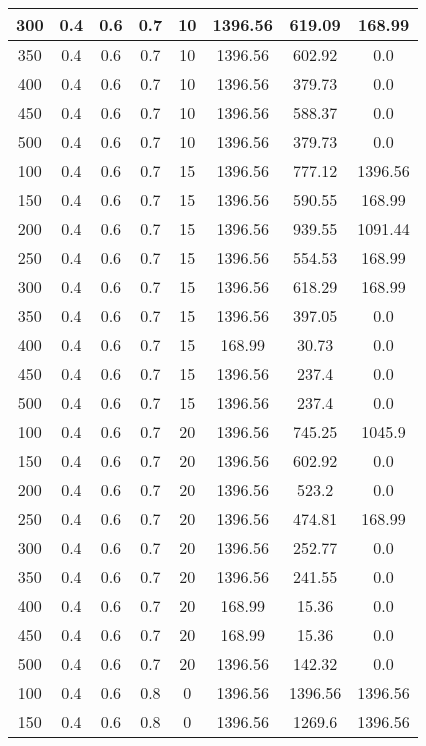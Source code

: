 \documentclass[a4paper, 12pt]{extreport}
\begin{document}
\begin{itemize}
\begin{longtable}{|c|c|c|c|c|c|c|c|}
			300 & 0.4 & 0.6 & 0.7 & 10 & 1396.56 & 619.09 & 168.99 \\\hline
			350 & 0.4 & 0.6 & 0.7 & 10 & 1396.56 & 602.92 & 0.0 \\\hline
			400 & 0.4 & 0.6 & 0.7 & 10 & 1396.56 & 379.73 & 0.0 \\\hline
			450 & 0.4 & 0.6 & 0.7 & 10 & 1396.56 & 588.37 & 0.0 \\\hline
			500 & 0.4 & 0.6 & 0.7 & 10 & 1396.56 & 379.73 & 0.0 \\\hline
			100 & 0.4 & 0.6 & 0.7 & 15 & 1396.56 & 777.12 & 1396.56 \\\hline
			150 & 0.4 & 0.6 & 0.7 & 15 & 1396.56 & 590.55 & 168.99 \\\hline
			200 & 0.4 & 0.6 & 0.7 & 15 & 1396.56 & 939.55 & 1091.44 \\\hline
			250 & 0.4 & 0.6 & 0.7 & 15 & 1396.56 & 554.53 & 168.99 \\\hline
			300 & 0.4 & 0.6 & 0.7 & 15 & 1396.56 & 618.29 & 168.99 \\\hline
			350 & 0.4 & 0.6 & 0.7 & 15 & 1396.56 & 397.05 & 0.0 \\\hline
			400 & 0.4 & 0.6 & 0.7 & 15 & 168.99 & 30.73 & 0.0 \\\hline
			450 & 0.4 & 0.6 & 0.7 & 15 & 1396.56 & 237.4 & 0.0 \\\hline
			500 & 0.4 & 0.6 & 0.7 & 15 & 1396.56 & 237.4 & 0.0 \\\hline
			100 & 0.4 & 0.6 & 0.7 & 20 & 1396.56 & 745.25 & 1045.9 \\\hline
			150 & 0.4 & 0.6 & 0.7 & 20 & 1396.56 & 602.92 & 0.0 \\\hline
			200 & 0.4 & 0.6 & 0.7 & 20 & 1396.56 & 523.2 & 0.0 \\\hline
			250 & 0.4 & 0.6 & 0.7 & 20 & 1396.56 & 474.81 & 168.99 \\\hline
			300 & 0.4 & 0.6 & 0.7 & 20 & 1396.56 & 252.77 & 0.0 \\\hline
			350 & 0.4 & 0.6 & 0.7 & 20 & 1396.56 & 241.55 & 0.0 \\\hline
			400 & 0.4 & 0.6 & 0.7 & 20 & 168.99 & 15.36 & 0.0 \\\hline
			450 & 0.4 & 0.6 & 0.7 & 20 & 168.99 & 15.36 & 0.0 \\\hline
			500 & 0.4 & 0.6 & 0.7 & 20 & 1396.56 & 142.32 & 0.0 \\\hline
			100 & 0.4 & 0.6 & 0.8 & 0 & 1396.56 & 1396.56 & 1396.56 \\\hline
			150 & 0.4 & 0.6 & 0.8 & 0 & 1396.56 & 1269.6 & 1396.56 \\\hline

\end{longtable}
\end{itemize}
\end{document}
